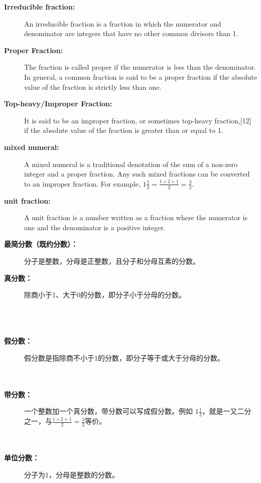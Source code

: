 \begin{paracol}{2}
\begin{description}
\item [{\bf Irreducible fraction:}] An irreducible fraction is a fraction in which the numerator and denominator are integers that have no other common divisors than 1.
\item [{\bf Proper Fraction: }] The fraction is called proper if the numerator is less than the denominator. In general, a common fraction is said to be a proper fraction if the absolute value of the fraction is strictly less than one.
\item [{\bf Top-heavy/Improper Fraction: }] It is said to be an improper fraction, or sometimes top-heavy fraction,[12] if the absolute value of the fraction is greater than or equal to 1.
\item [{\bf mixed numeral: }] A mixed numeral is a traditional denotation of the sum of a non-zero integer and a proper fraction. Any such mixed fractions can be converted to an improper fraction. For example, $1\frac{1}{2}=\frac{1\times2+1}{2}=\frac{3}{2}$.
\item [{\bf unit fraction: }] A unit fraction is a number written as a fraction where the numerator is one and the denominator is a positive integer.
\end{description}
\switchcolumn
\begin{description}
\item [{\bf 最简分数（既约分数）：}] 分子是整数，分母是正整数，且分子和分母互素的分数。\\ 
\item [{\bf 真分数：}] 除商小于1、大于0的分数，即分子小于分母的分数。\\ \\ \\ \\ 
\item [{\bf 假分数：}] 假分数是指除商不小于1的分数，即分子等于或大于分母的分数。\\ \\ \\ 
\item [{\bf 带分数：}] 一个整数加一个真分数，带分数可以写成假分数。例如 $1\frac{1}{2}$，就是一又二分之一，与$\frac{1\times2+1}{2}=\frac{3}{2}$等价。\\ \\ \\ 
\item [{\bf 单位分数：}] 分子为1，分母是整数的分数。
\end{description}
\end{paracol}

